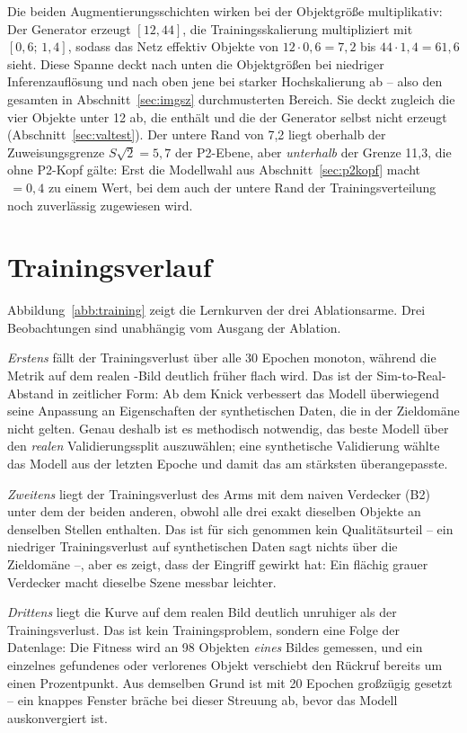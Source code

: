 Die beiden Augmentierungsschichten wirken bei der Objektgröße multiplikativ: Der
Generator erzeugt $[12, 44]$\px, die Trainingsskalierung multipliziert mit
$[0{,}6;\,1{,}4]$, sodass das Netz effektiv Objekte von
$12 \cdot 0{,}6 = 7{,}2$ bis $44 \cdot 1{,}4 = 61{,}6$\px{} sieht. Diese Spanne
deckt nach unten die Objektgrößen bei niedriger Inferenzauflösung und nach oben
jene bei starker Hochskalierung ab -- also den gesamten in
Abschnitt~\ref{sec:imgsz} durchmusterten Bereich. Sie deckt zugleich die vier
Objekte unter 12\px{} ab, die  enthält und die der Generator selbst
nicht erzeugt (Abschnitt~\ref{sec:valtest}). Der untere Rand von 7,2\px{} liegt
oberhalb der Zuweisungsgrenze $S\sqrt{2} = 5{,}7$\px{} der P2-Ebene, aber
\emph{unterhalb} der Grenze 11,3\px, die ohne P2-Kopf gälte: Erst die Modellwahl
aus Abschnitt~\ref{sec:p2kopf} macht $\,=0{,}4$ zu einem Wert, bei
dem auch der untere Rand der Trainingsverteilung noch zuverlässig zugewiesen
wird.

\section{Trainingsverlauf}
\label{sec:trainingsverlauf}

Abbildung~\ref{abb:training} zeigt die Lernkurven der drei Ablationsarme.
Drei Beobachtungen sind unabhängig vom Ausgang der Ablation.

\emph{Erstens} fällt der Trainingsverlust über alle 30 Epochen monoton, während
die Metrik auf dem realen -Bild deutlich früher flach wird. Das ist der
Sim-to-Real-Abstand in zeitlicher Form: Ab dem Knick verbessert das Modell
überwiegend seine Anpassung an Eigenschaften der synthetischen Daten, die in der
Zieldomäne nicht gelten. Genau deshalb ist es methodisch notwendig, das beste
Modell über den \emph{realen} Validierungssplit auszuwählen; eine synthetische
Validierung wählte das Modell aus der letzten Epoche und damit das am stärksten
überangepasste.

\emph{Zweitens} liegt der Trainingsverlust des Arms mit dem naiven Verdecker
(B2) unter dem der beiden anderen, obwohl alle drei exakt dieselben Objekte an
denselben Stellen enthalten. Das ist für sich genommen kein Qualitätsurteil --
ein niedriger Trainingsverlust auf synthetischen Daten sagt nichts über die
Zieldomäne --, aber es zeigt, dass der Eingriff gewirkt hat: Ein flächig grauer
Verdecker macht dieselbe Szene messbar leichter.

\emph{Drittens} liegt die Kurve auf dem realen Bild deutlich unruhiger als der
Trainingsverlust. Das ist kein Trainingsproblem, sondern eine Folge der
Datenlage: Die Fitness wird an 98 Objekten \emph{eines} Bildes gemessen, und ein
einzelnes gefundenes oder verlorenes Objekt verschiebt den Rückruf bereits um
einen Prozentpunkt. Aus demselben Grund ist  mit 20 Epochen
großzügig gesetzt -- ein knappes Fenster bräche bei dieser Streuung ab, bevor
das Modell auskonvergiert ist.


